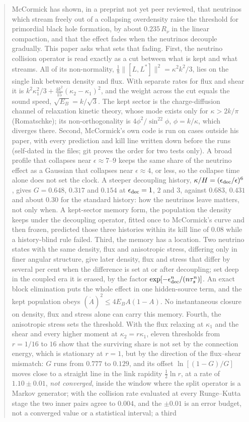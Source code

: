 \documentclass[11pt]{article}
\begin{document}
\begin{abstract}
McCormick has shown, in a preprint not yet peer reviewed, that neutrinos which stream freely out of a collapsing overdensity raise the threshold for primordial black hole formation, by about $0.235\,R_\nu$ in the linear compaction, and that the effect fades when the neutrinos decouple gradually. This paper asks what sets that fading. First, the neutrino collision operator is read exactly as a cut between what is kept and what streams. All of its non-normality, $\tfrac18\lVert[L,L^\ast]\rVert^2=\kappa^2k^2/3$, lies on the single link between density and flux. With separate rates for flux and shear it is $k^2\kappa_1^2/3+\tfrac{4k^2}{15}(\kappa_2-\kappa_1)^2$, and the weight across the cut equals the sound speed, $\sqrt{E_B}=k/\sqrt3$. The kept sector is the charge-diffusion channel of relaxation kinetic theory, whose mode exists only for $\kappa>2k/\pi$ (Romatschke); its non-orthogonality is $4\phi^2/\sin^22\phi$, $\phi=k/\kappa$, which diverges there. Second, McCormick's own code is run on cases outside his paper, with every prediction and kill line written down before the runs (self-dated in the files; git proves the order for two tests only). A broad profile that collapses near $\epsilon\approx7$--$9$ keeps the same share of the neutrino effect as a Gaussian that collapses near $\epsilon\approx4$, or less, so the collapse time alone does not set the clock. A steeper decoupling history, $\kappa/H=(\epsilon_{\rm dec}/\epsilon)^6$, gives $G=0.648$, $0.317$ and $0.154$ at $\epsilon_{\rm dec}=1$, $2$ and $3$, against $0.683$, $0.431$ and about $0.30$ for the standard history: how the neutrinos leave matters, not only when. A kept-sector memory form, the population the density keeps under the decoupling operator, fitted once to McCormick's curve and then frozen, predicted those three histories within its kill line of $0.08$ while a history-blind rule failed. Third, the memory has a location. Two neutrino states with the same density, flux and anisotropic stress, differing only in finer angular structure, give later density, flux and stress that differ by several per cent when the difference is set at or after decoupling; set deep in the coupled era it is erased, by the factor $\exp[-\epsilon_{\rm dec}^n/(n\tau_s^n)]$. An exact block elimination puts the whole effect in one hidden-source term, and the kept population obeys $(\dot A)^2\le4E_BA(1-A)$. No instantaneous closure on density, flux and stress alone can carry this memory. Fourth, the anisotropic stress sets the threshold. With the flux relaxing at $\kappa_1$ and the shear and every higher moment at $\kappa_2=r\kappa_1$, eleven thresholds from $r=1/16$ to $16$ show that the surviving share is not set by the connection energy, which is stationary at $r=1$, but by the direction of the flux--shear mismatch: $G$ runs from $0.777$ to $0.129$, and its offset $\ln[(1-G)/G]$ moves close to a straight line in the link rapidity $\tfrac12\ln r$, at a rate of $1.10\pm0.01$, \emph{not converged}, inside the window where the split operator is a Markov generator; with the collision rate evaluated at every Runge--Kutta stage the two inner pairs agree to $0.004$, and the $\pm0.01$ is an error budget, not a converged value or a statistical interval; a third 
\end{abstract}
\end{document}
